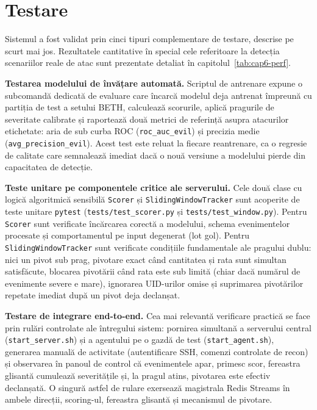 \section{Testare}


Sistemul a fost validat prin cinci tipuri complementare de testare,
descrise pe scurt mai jos. Rezultatele cantitative în special cele
referitoare la detecția scenariilor reale de atac sunt prezentate detaliat
în capitolul~\ref{tab:cap6-perf}.

\textbf{Testarea modelului de învățare automată.} Scriptul de antrenare
expune o subcomandă dedicată de evaluare care încarcă modelul deja antrenat
împreună cu partiția de test a setului BETH, calculează scorurile, aplică
pragurile de severitate calibrate și raportează două metrici de referință
asupra atacurilor etichetate: aria de sub curba ROC (\texttt{roc\_auc\_evil})
și precizia medie (\texttt{avg\_precision\_evil}). Acest test este reluat
la fiecare reantrenare, ca o regresie de calitate care semnalează imediat
dacă o nouă versiune a modelului pierde din capacitatea de detecție.

\textbf{Teste unitare pe componentele critice ale serverului.} Cele două
clase cu logică algoritmică sensibilă \texttt{Scorer} și
\texttt{SlidingWindowTracker} sunt acoperite de teste unitare \texttt{pytest}
(\texttt{tests/test\_scorer.py} și \texttt{tests/test\_window.py}). Pentru
\texttt{Scorer} sunt verificate încărcarea corectă a modelului,
schema evenimentelor procesate și comportamentul pe input
degenerat (lot gol). Pentru \texttt{SlidingWindowTracker} sunt verificate
condițiile fundamentale ale pragului dublu: nici un pivot sub prag, pivotare
exact când cantitatea și rata sunt simultan satisfăcute, blocarea pivotării
când rata este sub limită (chiar dacă numărul de evenimente severe e mare),
ignorarea UID-urilor omise și suprimarea pivotărilor repetate imediat
după un pivot deja declanșat.

\textbf{Testare de integrare end-to-end.} Cea mai relevantă verificare
practică se face prin rulări controlate ale întregului sistem: pornirea
simultană a serverului central (\texttt{start\_server.sh}) și a agentului
pe o gazdă de test (\texttt{start\_agent.sh}), generarea manuală de
activitate (autentificare SSH, comenzi controlate de recon) și observarea
în panoul de control că evenimentele apar, primesc scor, fereastra glisantă
cumulează severitățile și, la pragul atins, pivotarea este efectiv
declanșată. O singură astfel de rulare exersează magistrala Redis Streams
în ambele direcții, scoring-ul, fereastra glisantă și mecanismul de pivotare.

